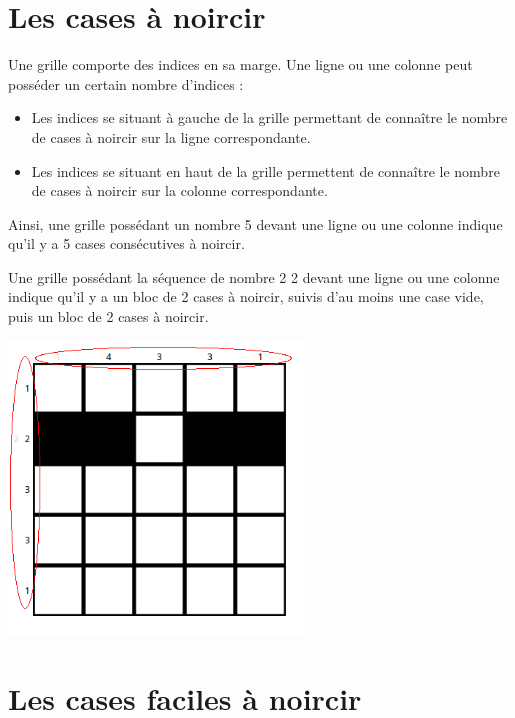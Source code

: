\documentclass[a4paper, 12pt]{report}
\begin{document}
		\section{Les cases à noircir}
    
            Une grille comporte des indices en sa marge. Une ligne ou une colonne peut posséder un certain nombre d'indices :
            \begin{itemize}
                \item Les indices se situant à gauche de la grille permettant de connaître le nombre de cases à noircir sur la ligne correspondante.
                \item Les indices se situant en haut de la grille permettent de connaître le nombre de cases à noircir sur la colonne correspondante.
            \end{itemize}
	        
	        Ainsi, une grille possédant un nombre 5 devant une ligne ou une colonne indique qu'il y a 5 cases consécutives à noircir.
	        
	        Une grille possédant la séquence de nombre 2 2 devant une ligne ou une colonne indique qu'il y a un bloc de 2 cases à noircir, suivis d'au moins une case vide, puis un bloc de 2 cases à noircir.

            \begin{minipage}{\linewidth}
                    \centering
			        \includegraphics[width=8cm]{exempleIndice.png}
	        \end{minipage}

		\section{Les cases faciles à noircir}
\end{document}
